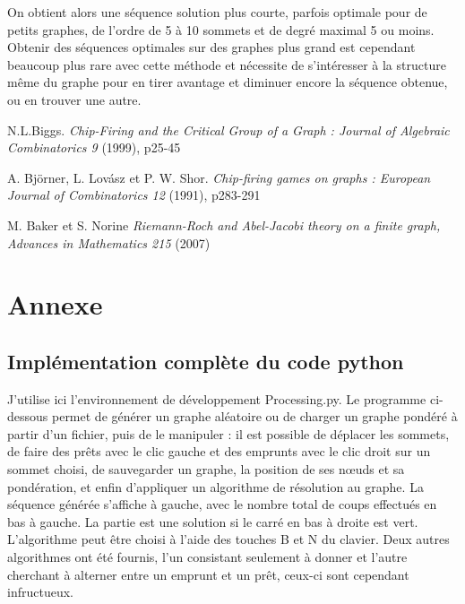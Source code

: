 \documentclass{article}
\newcommand{\debug}{false}
\newcommand{\note}[2]{
	\ifthenelse{\equal{\debug}{true}}{
		\hl{#1}\pdfcomment{#2}
	}{
		#1
	}
}
\begin{document}
On obtient alors une séquence solution plus courte, parfois optimale pour de petits graphes, de l'ordre de 5 à 10 sommets et de degré maximal 5 ou moins. Obtenir des séquences optimales sur des graphes plus grand est cependant beaucoup plus rare avec cette méthode et nécessite de s'intéresser à la structure même du graphe pour en tirer avantage et diminuer encore la séquence obtenue, ou en trouver une autre.

\newpage

\begin{thebibliography}{9}
	N.L.Biggs.
	\textit{Chip-Firing and the Critical Group of a Graph : Journal of Algebraic Combinatorics 9} (1999), p25-45

	A. Björner, L. Lovász et P. W. Shor.
	\textit{Chip-firing games on graphs : European Journal of Combinatorics 12} (1991), p283-291

	M. Baker et S. Norine
	\textit{Riemann-Roch and Abel-Jacobi theory on a finite graph, Advances	in Mathematics 215} (2007)
\end{thebibliography}

\newpage

\section{Annexe}

\subsection{Implémentation complète du code python}

J'utilise ici l'environnement de développement Processing.py. Le programme ci-dessous permet de générer un graphe aléatoire ou de charger un graphe pondéré à partir d'un fichier, puis de le manipuler : il est possible de déplacer les sommets, de faire des prêts avec le clic gauche et des emprunts avec le clic droit sur un sommet choisi, de sauvegarder un graphe, la position de ses nœuds et sa pondération, et enfin d'appliquer un algorithme de résolution au graphe. La séquence générée s'affiche à gauche, avec le nombre total de coups effectués en bas à gauche. La partie est une solution si le carré en bas à droite est vert.
L'algorithme peut être choisi à l'aide des touches B et N du clavier.
Deux autres algorithmes ont été fournis, l'un consistant seulement à donner et l'autre cherchant à alterner entre un emprunt et un prêt, ceux-ci sont cependant infructueux.
\end{document}
